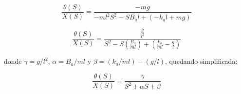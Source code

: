 \begin{equation*}
\frac{{\theta}(S)}{X(S)}=\frac{-mg}{-ml^{2}S^{2} - S B_a l + (-k_a l + mg)}
\end{equation*}

\begin{equation}
\frac{{\theta}(S)}{X(S)}=\frac{\frac{g}{l^{2}}}{S^{2} - S (\frac{B_a}{ml}) + (\frac{k_a}{ml} - \frac{g}{l})}
\label{ec51}
\end{equation}

donde $\gamma=g/l^{2}$, $\alpha=B_{a}/ml$ y $\beta=(k_{a}/ml) - (g/l)$, quedando simplificada:

\begin{equation}
\frac{\theta(S)}{X(S)}=\frac{\gamma}{S^{2}+\alpha S+\beta }
\label{ec52}
\end{equation}


